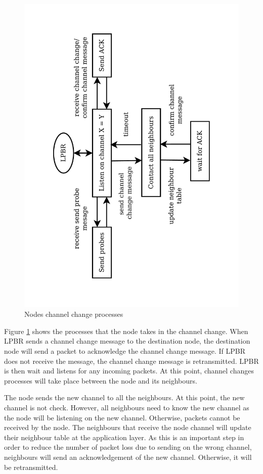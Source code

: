 \begin{figure}
\centering
\includegraphics[trim=2cm 2cm 2.5cm 2cm, clip=true, totalheight=0.58\textheight, angle=270]{otherNodes.pdf}
\caption{Nodes channel change processes}
\label{fig_otherNodes}
\end{figure}

Figure \ref{fig_otherNodes} shows the processes that the node takes in the channel change. When LPBR sends a channel change message to the destination node, the destination node will send a packet to acknowledge the channel change message. If LPBR does not receive the message, the channel change message is retransmitted. LPBR is then wait and listens for any incoming packets. At this point, channel changes processes will take place between the node and its neighbours.

The node sends the new channel to all the neighbours. At this point, the new channel is not check. However, all neighbours need to know the new channel as the node will be listening on the new channel. Otherwise, packets cannot be received by the node. The neighbours that receive the node channel will update their neighbour table at the application layer. As this is an important step in order to reduce the number of packet loss due to sending on the wrong channel, neighbours will send an acknowledgement of the new channel. Otherwise, it will be retransmitted. 


